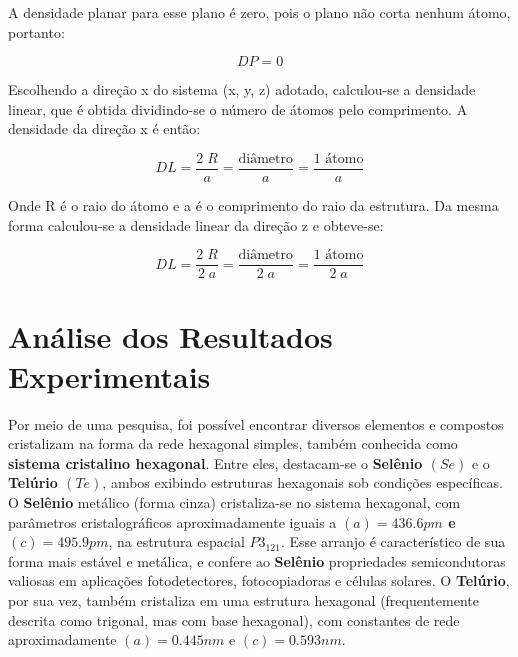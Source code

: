 \documentclass[10pt,twocolumn,letterpaper]{article}
\begin{document}
\hspace{1cm} A densidade planar para esse plano é zero, pois o plano não corta nenhum átomo, portanto:

\begin{equation*}
    DP = 0
\end{equation*}

Escolhendo a direção x do sistema (x, y, z) adotado, calculou-se a densidade linear, que é obtida dividindo-se o número de átomos pelo comprimento. A densidade da direção x é então:

\begin{equation*}
    DL = \frac{2\;R}{a} = \frac{\text{diâmetro}}{a} = \frac{\text{1 átomo}}{a}
\end{equation*}

\hspace{1cm} Onde R é o raio do átomo e a é o comprimento do raio da estrutura. Da mesma forma calculou-se a densidade linear da direção z e obteve-se:

\begin{equation*}
    DL = \frac{2\;R}{2\;a} = \frac{\text{diâmetro}}{2\;a} = \frac{\text{1 átomo}}{2\;a}
\end{equation*}


\section{Análise dos Resultados Experimentais}

\hspace{1cm} Por meio de uma pesquisa, foi possível  encontrar diversos elementos e compostos cristalizam na forma da rede hexagonal simples, também conhecida como \textbf{sistema cristalino hexagonal}. Entre eles, destacam-se o \textbf{Selênio $(Se)$} e o \textbf{Telúrio $(Te)$}, ambos exibindo estruturas hexagonais sob condições específicas. O \textbf{Selênio} metálico (forma cinza) cristaliza-se no sistema hexagonal, com parâmetros cristalográficos aproximadamente iguais a \textbf{$(a) = 436.6 pm$ e $(c) = 495.9 pm$}, na estrutura espacial \textbf{$P3_121$}. Esse arranjo é característico de sua forma mais estável e metálica, e confere ao \textbf{Selênio} propriedades semicondutoras valiosas em aplicações fotodetectores, fotocopiadoras e células solares. O \textbf{Telúrio}, por sua vez, também cristaliza em uma estrutura hexagonal (frequentemente descrita como trigonal, mas com base hexagonal), com constantes de rede aproximadamente $(a) = 0.445 nm$ e $(c) = 0.593 nm$.
\end{document}
